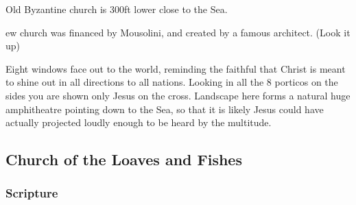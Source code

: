 \documentclass[letterpaper]{report}
\begin{document}
Old Byzantine church is 300ft lower close to the Sea.
 
ew church was financed by Mousolini, and created by a famous architect. (Look it up)

Eight windows face out to the world,
reminding the faithful that Christ is meant to shine out in all directions to all nations.
Looking in all the 8 porticos on the sides you are shown only Jesus on the cross.
Landscape here forms a natural huge amphitheatre pointing down to the Sea, so that it is likely Jesus could have actually projected loudly enough to be heard by the multitude.

\clearpage
\subsection{Church of the Loaves and Fishes}
\begin{multicols}{2}
	\mbox{}
\end{multicols}
\subsubsection{Scripture}
\end{document}
